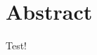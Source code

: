\documentclass[a4paper, twoside]{article}
\newcommand{\npsection}[1]{\newpage \section{#1}}
\begin{document}
    

    

    \npsection{Abstract}

    Test!
\end{document}
